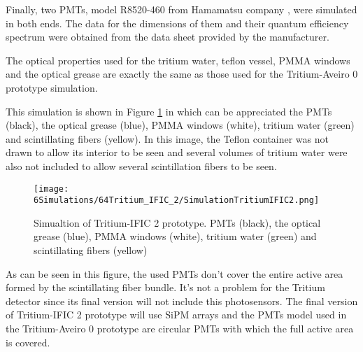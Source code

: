 Finally, two PMTs, model R8520-460 from Hamamatsu company \cite{DataSheetPMTs}, were simulated in both ends. The data for the dimensions of them and their quantum efficiency spectrum were obtained from the data sheet provided by the manufacturer.

The optical properties used for the tritium water, teflon vessel, PMMA windows and the optical grease are exactly the same as those used for the Tritium-Aveiro 0 prototype simulation.

This simulation is shown in Figure \ref{fig:TritiumIFIC2Simulation} in which can be appreciated the PMTs (black), the optical grease (blue), PMMA windows (white), tritium water (green) and scintillating fibers (yellow). In this image, the Teflon container was not drawn to allow its interior to be seen and several volumes of tritium water were also not included to allow several scintillation fibers to be seen.

\begin{figure}[h]
\centering
\texttt{[image: 6Simulations/64Tritium\_IFIC\_2/SimulationTritiumIFIC2.png]}
\caption{Simualtion of Tritium-IFIC 2 prototype. PMTs (black), the optical grease (blue), PMMA windows (white), tritium water (green) and scintillating fibers (yellow) \label{fig:TritiumIFIC2Simulation}}
\end{figure}

As can be seen in this figure, the used PMTs don't cover the entire active area formed by the scintillating fiber bundle. It's not a problem for the Tritium detector since its final version will not include this photosensors. The final version of Tritium-IFIC 2 prototype will use SiPM arrays and the PMTs model used in the Tritium-Aveiro 0 prototype are circular PMTs with which the full active area is covered.